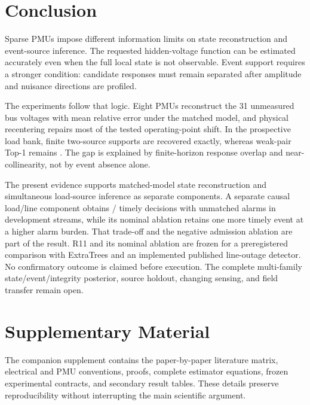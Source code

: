 \section{Conclusion}
\label{sec:conclusion}

Sparse PMUs impose different information limits on state reconstruction and event-source inference. The requested hidden-voltage function can be estimated accurately even when the full local state is not observable. Event support requires a stronger condition: candidate responses must remain separated after amplitude and nuisance directions are profiled.

The experiments follow that logic. Eight PMUs reconstruct the 31 unmeasured bus voltages with \BTwoTVE{} mean relative error under the matched model, and physical recentering repairs most of the tested operating-point shift. In the prospective load bank, finite two-source supports are recovered exactly, whereas weak-pair Top-1 remains \GlobalWeakTopOne{}. The gap is explained by finite-horizon response overlap and near-collinearity, not by event absence alone.

The present evidence supports matched-model state reconstruction and simultaneous load-source inference as separate components. A separate causal load/line component obtains \ContMixTimely{}/\ContMixTotal{} timely decisions with \ContMixExtras{} unmatched alarms in development streams, while its nominal ablation retains one more timely event at a higher alarm burden. That trade-off and the negative admission ablation are part of the result. R11 and its nominal ablation are frozen for a preregistered comparison with ExtraTrees and an implemented published line-outage detector. No confirmatory outcome is claimed before execution. The complete multi-family state/event/integrity posterior, source holdout, changing sensing, and field transfer remain open.

\section*{Supplementary Material}

The companion supplement contains the paper-by-paper literature matrix, electrical and PMU conventions, proofs, complete estimator equations, frozen experimental contracts, and secondary result tables. These details preserve reproducibility without interrupting the main scientific argument.
